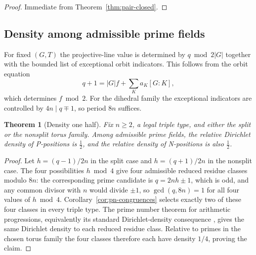\documentclass[11pt]{article}
\newtheorem{theorem}{Theorem}[section]
\theoremstyle{definition}
\theoremstyle{remark}
\newif\ifdraftnotes
\newcommand{\phasenote}[2]{%
  \ifdraftnotes
    \par\smallskip\noindent
    \fbox{\parbox{0.96\linewidth}{\footnotesize\textbf{[#1 owed]}\ #2}}%
    \par\smallskip
  \fi}
\begin{document}
\begin{proof}
Immediate from Theorem~\ref{thm:pair-closed}.
\end{proof}

\subsection{Density among admissible prime fields}

For fixed $(G,T)$ the projective-line value is determined by $q\bmod 2|G|$ together with the bounded
list of exceptional orbit indicators. This follows from the orbit equation
\begin{equation}
  q+1=|G|f+\sum_K a_K[G:K],
  \label{eq:general-orbit-equation}
\end{equation}
which determines $f\bmod2$. For the dihedral family the exceptional indicators are controlled by
$4n\mid q\mp1$, so period $8n$ suffices.

\begin{theorem}[Density one half]
\label{thm:density}
Fix $n\ge2$, a legal triple type, and either the split or the nonsplit torus family. Among
admissible prime fields, the relative Dirichlet density of P-positions is $\tfrac12$, and the
relative density of N-positions is also $\tfrac12$.
\end{theorem}

\begin{proof}
Let $h=(q-1)/2n$ in the split case and $h=(q+1)/2n$ in the nonsplit case. The four possibilities
$h\bmod4$ give four admissible reduced residue classes modulo $8n$: the corresponding prime
candidate is $q=2nh\pm1$, which is odd, and any common divisor with $n$ would divide $\pm1$, so
$\gcd(q,8n)=1$ for all four values of $h\bmod4$. Corollary~\ref{cor:pn-congruences} selects exactly
two of these four classes in every triple type. The prime number theorem for arithmetic
progressions, equivalently its standard Dirichlet-density consequence \cite{Davenport2000}, gives
the same Dirichlet density to each reduced residue class. Relative to primes in the chosen torus
family the four classes therefore each have density $1/4$, proving the claim.
\end{proof}

\phasenote{C307/C308}{Theorem~\ref{thm:density} is one of the paper's two Lean-anchored headline
results and must keep that status (Fable's change~1). C307 attaches the C278 boundary sentence: the
density-$\tfrac12$ kernel certificate is conditional on exactly one quarantined equidistribution
axiom (\texttt{primes\_equidistribute}), audited as
\texttt{[propext, Classical.choice, Quot.sound, primes\_equidistribute]}. The paper must not imply
an axiom-free Lean proof. C307 also re-derives the statement against the corrected
Corollary~\ref{cor:pn-congruences}.}
\end{document}
